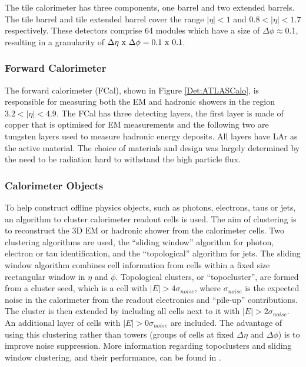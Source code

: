 The tile calorimeter has three components, one barrel and two extended barrels.
The tile barrel and tile extended barrel cover the range $|\eta|<1$ and $0.8<|\eta|<1.7$ respectively.
These detectors comprise 64 modules which have a size of $\Delta\phi\approx$0.1, resulting in a granularity of $\Delta\eta~\rm{x}~\Delta\phi = 0.1~\rm{x}~0.1$.

\subsubsection{Forward Calorimeter}

The forward calorimeter (FCal), shown in Figure \ref{Det:ATLASCalo}, is responsible for measuring both the EM and hadronic showers in the region $3.2<|\eta|<4.9$.
The FCal has three detecting layers, the first layer is made of copper that is optimised for EM measurements and the following two are tungsten layers used to measure hadronic energy deposits.
All layers have LAr as the active material.
The choice of materials and design was largely determined by the need to be radiation hard to withstand the high particle flux.


\subsubsection{Calorimeter Objects}


To help construct offline physics objects, such as photons, electrons, taus or jets, an algorithm to cluster calorimeter readout cells is used.
The aim of clustering is to reconstruct the 3D EM or hadronic shower from the calorimeter cells.
Two clustering algorithms are used, the ``sliding window'' algorithm for photon, electron or tau identification, and the ``topological'' algorithm for jets.
The sliding window algorithm combines cell information from cells within a fixed size rectangular window in $\eta$ and $\phi$. 
Topological clusters, or ``topocluster'', are formed from a cluster seed, which is a cell with $|E|>4\sigma_{noise}$, where $\sigma_{noise}$ is the expected noise in the calorimeter from the readout electronics and ``pile-up'' contributions. 
The cluster is then extended by including all cells next to it with $|E|>2\sigma_{noise}$.
An additional layer of cells with $|E|>0\sigma_{noise}$ are included.
The advantage of using this clustering rather than towers (groups of cells at fixed $\Delta\eta$ and $\Delta\phi$) is to improve noise suppression.
More information regarding topoclusters and sliding window clustering, and their performance, can be found in \cite{ref:ZeeCalib,ref:Clustering}.


